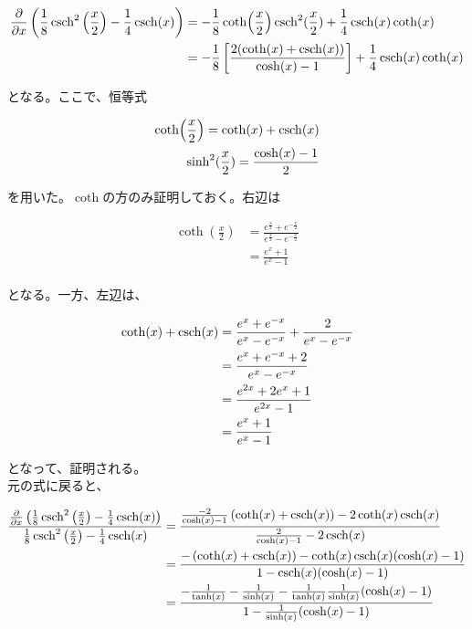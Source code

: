 \documentclass[a4paper,11pt]{jsarticle}
\numberwithin{equation}{section}
\begin{document}
\begin{align}
  \frac{\partial}{\partial x}\left(\frac{1}{8}\csch^2\left(\frac{x}{2}\right)-\frac{1}{4}\csch(x)\right) 
  &= -\frac{1}{8}\coth(\frac{x}{2})\csch^2(\frac{x}{2})+\frac{1}{4}\csch(x)\coth(x)\\
  &= -\frac{1}{8}\left[\frac{2(\coth(x)+\csch(x))}{\cosh(x)-1}\right] +\frac{1}{4}\csch(x)\coth(x)\\
\end{align}

となる。ここで、恒等式

\begin{align}
  \coth(\frac{x}{2})=\coth(x)+\csch(x)\\
  \sinh^2(\frac{x}{2})=\frac{\cosh(x)-1}{2}
\end{align}

を用いた。$\coth$の方のみ証明しておく。右辺は

\begin{align}
  \coth(\frac{x}{2})&=\frac{e^{\frac{x}{2}}+e^{-\frac{x}{2}}}{e^{\frac{x}{2}}-e^{-\frac{x}{2}}}\\
  &=\frac{e^x+1}{e^x-1}\\
\end{align}

となる。一方、左辺は、

\begin{align}
  \coth(x)+\csch(x)&=\frac{e^x+e^{-x}}{e^x-e^{-x}}+\frac{2}{e^x-e^{-x}}\\
  &=\frac{e^x+e^{-x}+2}{e^x-e^{-x}}\\
  &=\frac{e^{2x}+2e^x+1}{e^{2x}-1}\\
  &=\frac{e^x+1}{e^x-1}
\end{align}

となって、証明される。\\

元の式に戻ると、

\begin{align}
  \frac{\frac{\partial}{\partial x}\left(\frac{1}{8}\csch^2\left(\frac{x}{2}\right)-\frac{1}{4}\csch(x)\right)}{\frac{1}{8}\csch^2\left(\frac{x}{2}\right)-\frac{1}{4}\csch(x)}
  &= \frac{\frac{-2}{\cosh(x)-1}\left(\coth(x)+\csch(x)\right)-2\coth(x)\csch(x)}{\frac{2}{\cosh(x)-1}-2\csch(x)}\\
  &= \frac{-\left(\coth(x)+\csch(x)\right)-\coth(x)\csch(x)(\cosh(x)-1)}{1-\csch(x)(\cosh(x)-1)}\\
  &= \frac{-\frac{1}{\tanh(x)}-\frac{1}{\sinh(x)}-\frac{1}{\tanh(x)}\frac{1}{\sinh(x)}(\cosh(x)-1)}{1-\frac{1}{\sinh(x)}(\cosh(x)-1)}\\
\end{align}
\end{document}
